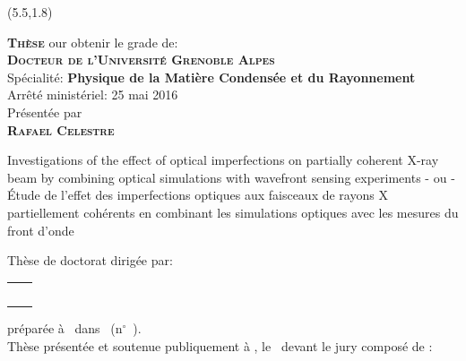 \documentclass[a4paper, twoside]{report}
\newcommand{\thesisTitle}{Investigations of the effect of optical imperfections on partially coherent X-ray beam by combining optical simulations with wavefront sensing experiments}
\newcommand{\thesisTitleFR}{\'Etude de l'effet des imperfections optiques aux faisceaux de rayons X partiellement coh\'erents en combinant les simulations optiques avec les mesures du front d'onde}
\begin{document}
\begin{singlespace}
\begin{textblock}{10}(5.5,1.8)
	\color{black}

	\begin{flushleft}
	    \large \textbf{\textsc{Thèse}} our obtenir le grade de:\\ \bigskip \vfill  
	    \Large \textbf{\textsc{Docteur de l’Université Grenoble Alpes}} \\
        \large Spécialité: \textbf{Physique de la Matière Condensée et du Rayonnement}\\
        \small Arrêté ministériel: 25 mai 2016\\ \bigskip \vfill  
        \large Présentée par\\ \bigskip \vfill 
        \Large \textbf{\textsc{Rafael Celestre}}\\ \bigskip \vfill 
	\end{flushleft}
	\begin{center}
		\Large{\thesisTitle} \bigskip %
		\vfill
		\large{- ou -} \bigskip
		\vfill
		\Large{\thesisTitleFR} \bigskip %
		\vfill
	\end{center}
	\begin{flushleft}
		\small Thèse de doctorat dirigée par: \\ \bigskip
		\small
		\begin{tabular}{@{} L{9.5cm} R{4.5cm}}
    		\jurynameE  \\ \juryadressE & \juryroleE \\
    		\jurynameF  \\ \juryadressF & \juryroleF  \\ \bigskip
	\end{tabular} 
		\small préparée à \PhDworkingplace~dans \ecodoctitle~(n$^{\circ}$~\ecodocnum).\\ \bigskip
		\vfill
		Thèse présentée et soutenue publiquement à , le ~devant le jury composé de :
	\end{flushleft}
	\small


\end{textblock}
\end{singlespace}
\end{document}
